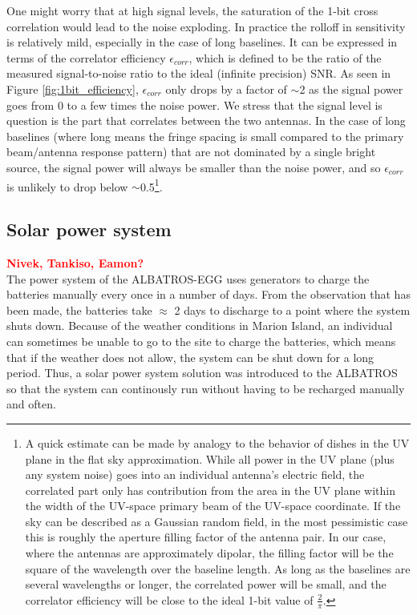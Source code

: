\documentclass{ws-jai}
\begin{document}
One might worry that at high signal levels, the saturation of the 1-bit cross correlation would lead to the noise exploding.  In practice the rolloff in sensitivity is relatively mild, especially in the case of long baselines.  It can be expressed in terms of the correlator efficiency $\epsilon_{corr}$, which is defined to be the ratio of the measured signal-to-noise ratio to the ideal (infinite precision) SNR.  As seen in Figure \ref{fig:1bit_efficiency}, $\epsilon_{corr}$ only drops by a factor of $\sim$2 as the signal power goes from 0 to a few times the noise power.  We stress that the signal level is question is the part that correlates between the two antennas.  In the case of long baselines (where long means the fringe spacing is small compared to the primary beam/antenna response pattern) that are not dominated by a single bright source, the signal power will always be smaller than the noise power, and so $\epsilon_{corr}$ is unlikely to drop below $\sim$0.5\footnote{A quick estimate can be made by analogy to the behavior of dishes in the UV plane in the flat sky approximation.  While all power in the UV plane (plus any system noise) goes into an individual antenna's electric field, the correlated part only has contribution from the area in the UV plane within the width of the UV-space primary beam of the UV-space coordinate.  If the sky can be described as a Gaussian random field, in the most pessimistic case this is roughly the aperture filling factor of the antenna pair.  In our case, where the antennas are approximately dipolar, the filling factor will be the square of the wavelength over the baseline length.  As long as the baselines are several wavelengths or longer, the correlated power will be small, and the correlator efficiency will be close to the ideal 1-bit value of $\frac{2}{\pi}$.}.


\subsection{Solar power system}
\textcolor{red}{\bf Nivek, Tankiso, Eamon?} \\
The power system of the ALBATROS-EGG uses generators to charge the batteries manually every once in a number of days. From the observation that has been made, the batteries take $\approx$ 2 days to discharge to a point where the system shuts down. Because of the weather conditions in Marion Island, an individual can sometimes be unable to go to the site to charge the batteries, which means that if the weather does not allow, the system can be shut down for a long period. Thus, a solar power system solution was introduced to the ALBATROS so that the system can continously run without having to be recharged manually and often.\\
\end{document}
